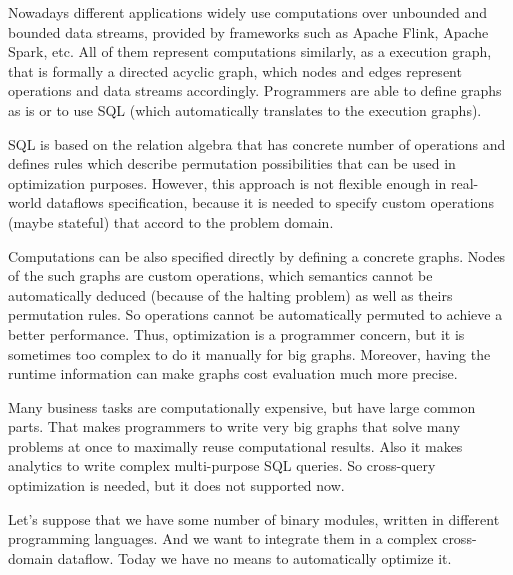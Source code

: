 Nowadays different applications widely use computations over unbounded and bounded data streams, provided by frameworks such as Apache Flink, Apache Spark, etc.
All of them represent computations similarly, as a execution graph, that is formally a directed acyclic graph, which nodes and edges represent operations and data streams accordingly.
Programmers are able to define graphs as is or to use SQL (which automatically translates to the execution graphs).

SQL is based on the relation algebra that has concrete number of operations and defines rules which describe permutation possibilities that can be used in optimization purposes.
However, this approach is not flexible enough in real-world dataflows specification, because it is needed to specify custom operations (maybe stateful) that accord to the problem domain.

Computations can be also specified directly by defining a concrete graphs.
Nodes of the such graphs are custom operations, which semantics cannot be automatically deduced (because of the halting problem) as well as theirs permutation rules.
So operations cannot be automatically permuted to achieve a better performance.
Thus, optimization is a programmer concern, but it is sometimes too complex to do it manually for big graphs.
Moreover, having the runtime information can make graphs cost evaluation much more precise.

Many business tasks are computationally expensive, but have large common parts.
That makes programmers to write very big graphs that solve many problems at once to maximally reuse computational results.
Also it makes analytics to write complex multi-purpose SQL queries.
So cross-query optimization is needed, but it does not supported now.

Let's suppose that we have some number of binary modules, written in different programming languages.
And we want to integrate them in a complex cross-domain dataflow.
Today we have no means to automatically optimize it.
